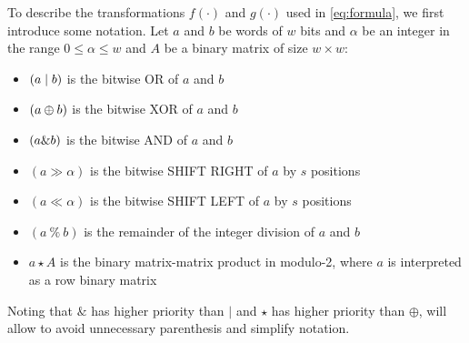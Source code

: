 \documentclass[preprint,1p,times]{elsarticle}
\begin{document}
To describe the transformations $f(\cdot)$ and $g(\cdot)$ used in \eqref{eq:formula}, we first introduce some notation. Let $a$ and $b$ be words of $w$ bits and $\alpha$ be an integer in the range $0\le \alpha \le w$ and $A$ be a binary matrix of size $w \times w$:
\begin{itemize}
    \item $(a \mid b)$ is the bitwise OR of $a$ and $b$
    \item $(a \mathbin{\oplus} b)$ is the bitwise XOR of $a$ and $b$
    \item $(a \& b)$ is the bitwise AND of $a$ and $b$
    \item $(a \gg \alpha)$ is the bitwise SHIFT RIGHT of $a$ by $s$ positions
    \item $(a \ll \alpha)$ is the bitwise SHIFT LEFT of $a$ by $s$ positions
    \item $(a~\%~b)$ is the remainder of the integer division of $a$ and $b$
    \item $a \star A$ is the binary matrix-matrix product in modulo-2, where $a$ is interpreted as a row binary matrix
\end{itemize}
Noting that $\&$ has higher priority than $\mid$ and $\star$ has higher priority than $\oplus$, will allow to avoid unnecessary parenthesis and simplify notation.
\end{document}
